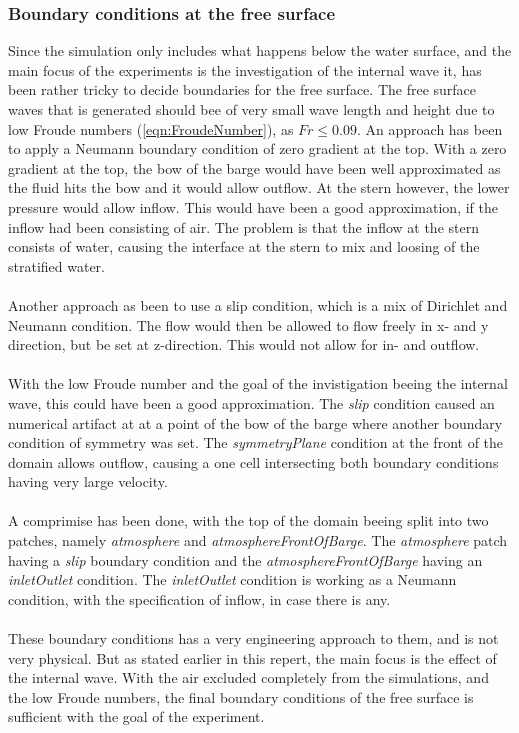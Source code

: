 \documentclass[a4paper, 12pt]{report}
\begin{document}
\subsubsection{Boundary conditions at the free surface}
Since the simulation only includes what happens below the water surface, and the main focus of the experiments is the investigation of the internal wave it, has been rather tricky to decide boundaries for the free surface. The free surface waves that is generated should bee of very small wave length and height due to low Froude numbers (\ref{eqn:FroudeNumber}), as $Fr \leq 0.09 $. An approach has been to apply a Neumann boundary condition of zero gradient at the top. With a zero gradient at the top, the bow of the barge would have been well approximated as the fluid hits the bow and it would allow outflow. At the stern however, the lower pressure would allow inflow. This would have been a good approximation, if the inflow had been consisting of air. The problem is that the inflow at the stern consists of water, causing the interface at the stern to mix and loosing of the stratified water. \\
\\
Another approach as been to use a slip condition, which is a mix of Dirichlet and Neumann condition. The flow would then be allowed to flow freely in x- and y direction, but be set at z-direction. This would not allow for in- and outflow.\\
\\
With the low Froude number and the goal of the invistigation beeing the internal wave, this could have been a good approximation. The \textit{slip} condition caused an numerical artifact at at a point of the bow of the barge where another boundary condition of symmetry was set. The \textit{symmetryPlane} condition at the front of the domain allows outflow, causing a one cell intersecting both boundary conditions having very large velocity.\\
\\
A comprimise has been done, with the top of the domain beeing split into two patches, namely \textit{atmosphere} and \textit{atmosphereFrontOfBarge}. The \textit{atmosphere} patch having a \textit{slip} boundary condition and the \textit{atmosphereFrontOfBarge} having an \textit{inletOutlet} condition. The \textit{inletOutlet} condition is working as a Neumann condition, with the specification of inflow, in case there is any. \\
\\
These boundary conditions has a very engineering approach to them, and is not very physical. But as stated earlier in this repert, the main focus is the effect of the internal wave. With the air excluded completely from the simulations, and the low Froude numbers, the final boundary conditions of the free surface is sufficient with the goal of the experiment.
\end{document}
